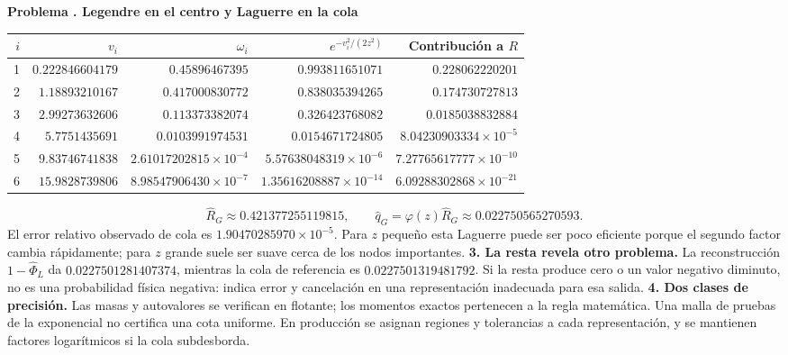 \documentclass[11pt,a4paper]{article}
\theoremstyle{definition}
\newcounter{problema}
\newenvironment{resuelto}[1]{\refstepcounter{problema}\par\medskip\Needspace{6\baselineskip}\textbf{Problema \theproblema. #1}\par}{\par\medskip}
\begin{document}
\begin{resuelto}{Legendre en el centro y Laguerre en la cola}
\begin{center}\small\begin{tabular}{rrrrr}
\toprule
$i$&$v_i$&$\omega_i$&$e^{-v_i^2/(2z^2)}$&Contribución a $R$\\
\midrule
1&$0.222846604179$&$0.45896467395$&$0.993811651071$&$0.228062220201$\\
2&$1.18893210167$&$0.417000830772$&$0.838035394265$&$0.174730727813$\\
3&$2.99273632606$&$0.113373382074$&$0.326423768082$&$0.0185038832884$\\
4&$5.7751435691$&$0.0103991974531$&$0.0154671724805$&$8.04230903334\times10^{-5}$\\
5&$9.83746741838$&$2.61017202815\times10^{-4}$&$5.57638048319\times10^{-6}$&$7.27765617777\times10^{-10}$\\
6&$15.9828739806$&$8.98547906430\times10^{-7}$&$1.35616208887\times10^{-14}$&$6.09288302868\times10^{-21}$\\
\bottomrule\end{tabular}\end{center}
\[
\widehat R_G\approx0.421377255119815,\qquad
\widehat q_G=\varphi(z)\widehat R_G\approx0.022750565270593.
\]
El error relativo observado de cola es $1.90470285970\times10^{-5}$. Para $z$ pequeño esta Laguerre puede ser poco eficiente porque el segundo factor cambia rápidamente; para $z$ grande suele ser suave cerca de los nodos importantes.
\textbf{3. La resta revela otro problema.} La reconstrucción $1-\widehat\Phi_L$ da $0.0227501281407374$, mientras la cola de referencia es $0.0227501319481792$. Si la resta produce cero o un valor negativo diminuto, no es una probabilidad física negativa: indica error y cancelación en una representación inadecuada para esa salida.
\textbf{4. Dos clases de precisión.} Las masas y autovalores se verifican en flotante; los momentos exactos pertenecen a la regla matemática. Una malla de pruebas de la exponencial no certifica una cota uniforme. En producción se asignan regiones y tolerancias a cada representación, y se mantienen factores logarítmicos si la cola subdesborda.
\end{resuelto}
\end{document}
